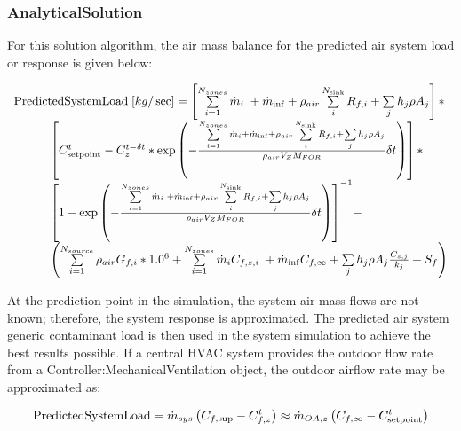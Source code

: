 \subsubsection{AnalyticalSolution}\label{analyticalsolution-000}

For this solution algorithm, the air mass balance for the predicted air system load or response is given below:

\begin{equation}
\begin{array}{l}{\rm{PredictedSystemLoad}}\;[kg/\sec ] = \left[ {\sum\limits_{i = 1}^{{N_{zones}}} {{{\dot m}_i}} \; + {{\dot m}_{\inf }} + {\rho_{air}}\sum\limits_i^{{N_{{\rm{sink}}}}} {{R_{f,i}} + \sum\limits_j {{h_j}\rho {A_j}} } } \right]*\\\;\;\;\;\;\;\;\;\;\;\;\left[ {C_{{\rm{setpoint}}}^t - C_z^{t - \delta t}*\exp \left( { - \frac{{\sum\limits_{i = 1}^{{N_{zones}}} {{{\dot m}_i}}  + {{\dot m}_{\inf }} + {\rho_{air}}\sum\limits_i^{{N_{{\rm{sink}}}}} {{R_{f,i}} + \sum\limits_j {{h_j}\rho {A_j}} } }}{{{\rho_{air}}{V_Z}{M_{FOR}}}}\delta t} \right)} \right]*\\\;\;\;\;\;\;\;\;\;\;\;{\left[ {1 - \exp \left( { - \frac{{\sum\limits_{i = 1}^{{N_{zones}}} {{{\dot m}_i}} \; + {{\dot m}_{\inf }} + {\rho_{air}}\sum\limits_i^{{N_{{\rm{sink}}}}} {{R_{f,i}} + \sum\limits_j {{h_j}\rho {A_j}} } }}{{{\rho_{air}}{V_Z}{M_{FOR}}}}\delta t} \right)} \right]^{ - 1}} - \\\;\;\;\;\;\;\;\;\;\;\;\left( {\sum\limits_{i = 1}^{{N_{source}}} {{\rho_{air}}{G_{f,i}}*{{1.0}^6}}  + \sum\limits_{i = 1}^{{N_{zones}}} {{{\dot m}_i}} {C_{f,z,i}}\; + {{\dot m}_{\inf }}{C_{f,\infty }} + \sum\limits_j {{h_j}\rho {A_j}} \frac{{{C_{s,j}}}}{{{k_j}}} + {S_f}} \right)\end{array}
\end{equation}

At the prediction point in the simulation, the system air mass flows are not known; therefore, the system response is approximated. The predicted air system generic contaminant load is then used in the system simulation to achieve the best results possible. If a central HVAC system provides the outdoor flow rate from a Controller:MechanicalVentilation object, the outdoor airflow rate may be approximated as:

\begin{equation}
{\rm{PredictedSystemLoad}} = {\dot m_{sys}}\left( {{C_{f,\sup }} - C_{f,z}^t} \right) \approx {\dot m_{OA,z}}\left( {{C_{f,\infty }} - C_{{\rm{setpoint}}}^t} \right)
\end{equation}

